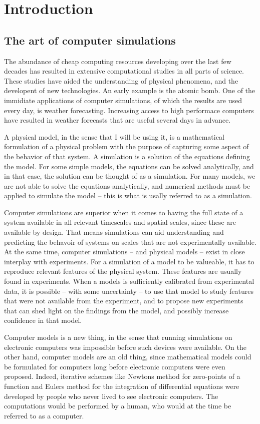 \chapter{Introduction}
\section{The art of computer simulations}
The abundance of cheap computing resources developing over the last few decades has resulted in extensive computational studies in all parts of science. These studies have aided the understanding of physical phenomena, and the developent of new technologies. An early example is the atomic bomb. One of the immidiate applications of computer simulations, of which the results are used every day, is weather forecasting. Increasing access to high performace computers have resulted in weather forecasts that are useful several days in advance. 

A physical model, in the sense that I will be using it, is a mathematical formulation of a physical problem with the purpose of capturing some aspect of the behavior of that system. A simulation is a solution of the equations defining the model. For some simple models, the equations can be solved analytically, and in that case, the solution can be thought of as a simulation. For many models, we are not able to solve the equations analytically, and numerical methods must be applied to simulate the model -- this is what is usally referred to as a simulation.

Computer simulations are superior when it comes to having the full state of a system available in all relevant timescales and spatial scales, since these are available by design. That means simulations can aid understanding and predicting the behavoir of systems on scales that are not experimentally available. At the same time, computer simulations -- and physical models -- exist in close interplay with experiments. For a simulation of a model to be valueable, it has to reproduce relevant features of the physical system. These features are usually found in experiments. When a models is sufficiently calibrated from experimental data, it is possible -- with some uncertainty -- to use that model to study features that were not available from the experiment, and to propose new experiments that can shed light on the findings from the model, and possibly increase confidence in that model.

Computer models is a new thing, in the sense that running simulations on electronic computers was impossible before such devices were available. On the other hand, computer models are an old thing, since mathematical models could be formulated for computers long before electronic computers were even proposed. Indeed, iterative schemes like Newtons method for zero-points of a function and Eulers method for the integration of differential equations were developed by people who never lived to see electronic computers. The computations would be performed by a human, who would at the time be referred to as a computer. 

